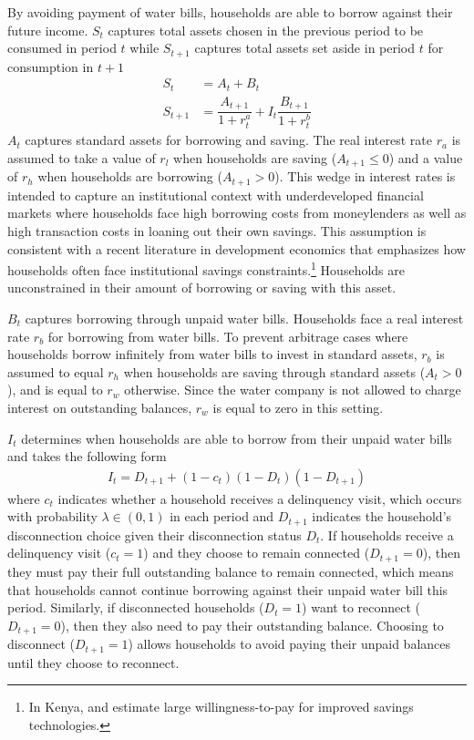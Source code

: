 \documentclass[12pt]{article}
\begin{document}
By avoiding payment of water bills, households are able to borrow against their future income.  $S_t$ captures total assets chosen in the previous period to be consumed in period $t$ while $S_{t+1}$ captures total assets set aside in period $t$ for consumption in $t+1$ %
\begin{align}
S_t &= A_t + B_t \\
S_{t+1} &=  \dfrac{A_{t+1}}{1+r^{a}_{t}}  + I_t \dfrac{B_{t+1}}{1+r^{b}_{t}} 
\end{align}
$A_t$ captures standard assets for borrowing and saving.  The real interest rate $r_a$ is assumed to take a value of $r_l$ when households are saving ($A_{t+1} \leq 0$) and a value of $r_h$ when households are borrowing ($A_{t+1} > 0$).  This wedge in interest rates is intended to capture an institutional context with underdeveloped financial markets where households face high borrowing costs from moneylenders as well as high transaction costs in loaning out their own savings.  This assumption is consistent with a recent literature in development economics that emphasizes how households often face institutional savings constraints.\footnote{In Kenya, \cite{dupas2013savings} and \cite{dupas2013don} estimate large willingness-to-pay for improved savings technologies.}  Households are unconstrained in their amount of borrowing or saving with this asset.  %

$B_t$ captures borrowing through unpaid water bills.  Households face a real interest rate $r_b$ for borrowing from water bills.  To prevent arbitrage cases where households borrow infinitely from water bills to invest in standard assets, $r_b$ is assumed to equal $r_h$ when households are saving through standard assets ($A_t>0$), and is equal to $r_w$ otherwise.  Since the water company is not allowed to charge interest on outstanding balances, $r_w$ is equal to zero in this setting.%

$I_t$ determines when households are able to borrow from their unpaid water bills and takes the following form
\begin{align}
I_t = D_{t+1} + (1-c_t) (1-D_t) (1-D_{t+1})
\end{align} %
where $c_t$ indicates whether a household receives a delinquency visit, which occurs with probability $\lambda \in (0,1)$ in each period and $D_{t+1}$ indicates the household's disconnection choice given their disconnection status $D_t$.  If households receive a delinquency visit ($c_t=1$) and they choose to remain connected ($D_{t+1}=0$), then they must pay their full outstanding balance to remain connected, which means that households cannot continue borrowing against their unpaid water bill this period.  Similarly, if disconnected households ($D_t=1$) want to reconnect  ($D_{t+1}=0$), then they also need to pay their outstanding balance.  Choosing to disconnect ($D_{t+1}=1$) allows households to avoid paying their unpaid balances until they choose to reconnect.  
\end{document}

